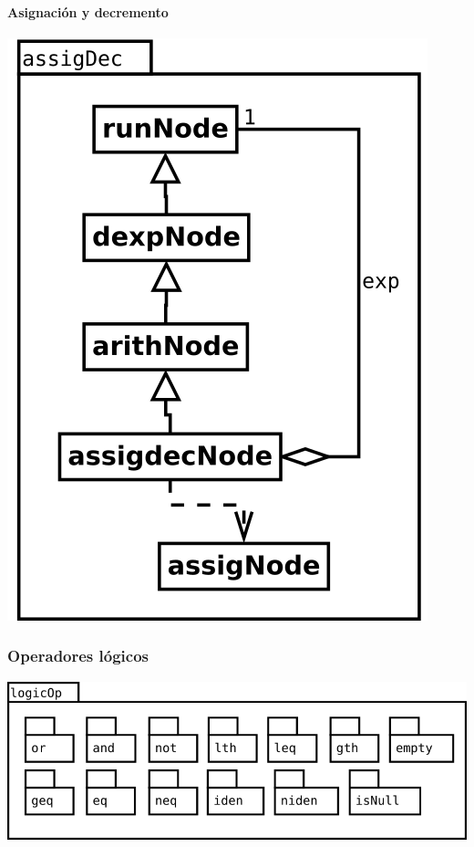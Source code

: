 \paragraph {Asignación y decremento}
\begin{center}
\includegraphics[scale=0.4]{assigDec.png} \\
\end{center}
\pagebreak
\subsubsection {Operadores lógicos}
\begin{center}
\includegraphics[scale=0.4]{logicOp-package.png} \\
\end{center}

